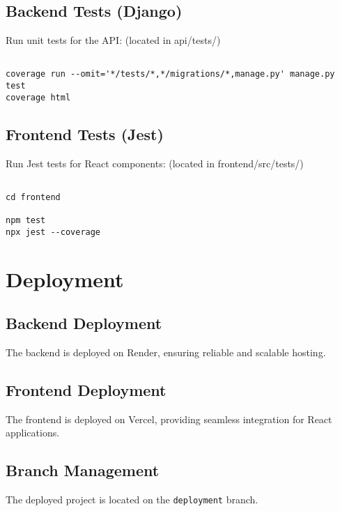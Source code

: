 \documentclass[a4paper,12pt]{article}
\begin{document}
\subsection{Backend Tests (Django)}

Run unit tests for the API: (located in api/tests/)

\begin{verbatim}

coverage run --omit='*/tests/*,*/migrations/*,manage.py' manage.py test
coverage html

\end{verbatim}



\subsection{Frontend Tests (Jest)}

Run Jest tests for React components: (located in frontend/src/tests/)

\begin{verbatim}

cd frontend

npm test
npx jest --coverage

\end{verbatim}



\section{Deployment}



\subsection{Backend Deployment}

The backend is deployed on Render, ensuring reliable and scalable hosting.



\subsection{Frontend Deployment}

The frontend is deployed on Vercel, providing seamless integration for React applications.



\subsection{Branch Management}

The deployed project is located on the \texttt{deployment} branch.
\end{document}
